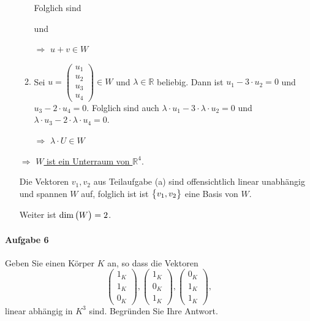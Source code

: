 \documentclass{scrreprt}
\begin{document}
\begin{enumerate}[(a)]
\begin{enumerate}[(1)]
    Folglich sind
    und

    $\Rightarrow$ \underline{$u + v \in W$}

  \item Sei $u = \begin{pmatrix}u_1 \\ u_2 \\ u_3 \\ u_4\end{pmatrix} \in W$
    und $\lambda \in \mathbb{R}$ beliebig.
    Dann ist $u_1 - 3 \cdot u_2 = 0$ und $u_3 - 2 \cdot u_4 = 0$.
    Folglich sind auch $\lambda \cdot u_1 - 3 \cdot \lambda \cdot u_2 = 0$
    und $\lambda \cdot u_3 - 2 \cdot \lambda \cdot u_4 = 0$.

    $\Rightarrow$ \underline{$\lambda \cdot U \in W$}
  \end{enumerate}

  $\Rightarrow$ \underline{$W$ ist ein Unterraum von $\mathbb{R}^4$}.

  Die Vektoren $v_1, v_2$ aus Teilaufgabe (a) sind offensichtlich linear
  unabhängig und spannen $W$ auf, folglich ist ist $\qty\big{v_1, v_2}$
  eine Basis von $W$.

  Weiter ist $\dim\qty\big(W) = 2$.
\end{enumerate}

\paragraph{Aufgabe 6} Geben Sie einen Körper $K$ an, so dass die Vektoren
\[
  \begin{pmatrix}1_K \\ 1_K \\ 0_K \end{pmatrix},
  \begin{pmatrix}1_K \\ 0_K \\ 1_K \end{pmatrix},
  \begin{pmatrix}0_K \\ 1_K \\ 1_K \end{pmatrix},
\]
linear abhängig in $K^3$ sind.
Begründen Sie Ihre Antwort.
\end{document}
